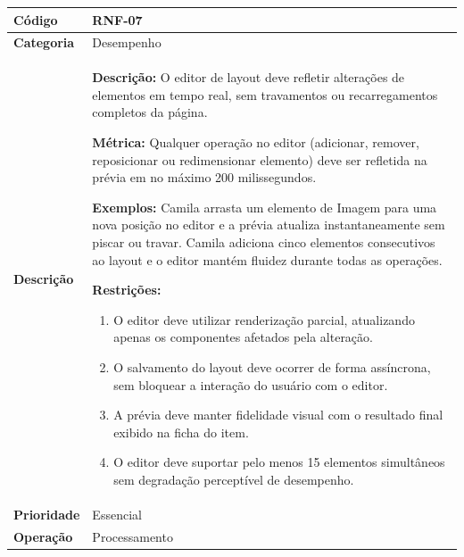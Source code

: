 \FloatBarrier
\begin{quadro}[h!]
\caption{RNF-07 -- Desempenho do Editor de Layout}
\label{quad:rnf07}
\begin{tabular}{|p{3.2cm}|p{11.8cm}|}
\hline
\textbf{Código}     & RNF-07 \\ \hline
\textbf{Categoria}  & Desempenho \\ \hline
\textbf{Descrição}  &
\textbf{Descrição:} O editor de layout deve refletir alterações de elementos em tempo real, sem travamentos ou recarregamentos completos da página.

\textbf{Métrica:} Qualquer operação no editor (adicionar, remover, reposicionar ou redimensionar elemento) deve ser refletida na prévia em no máximo 200 milissegundos.

\textbf{Exemplos:} Camila arrasta um elemento de Imagem para uma nova posição no editor e a prévia atualiza instantaneamente sem piscar ou travar.
Camila adiciona cinco elementos consecutivos ao layout e o editor mantém fluidez durante todas as operações.

\textbf{Restrições:}
\begin{enumerate}[nosep,leftmargin=1.2em,topsep=2pt,partopsep=0pt,parsep=0pt,itemsep=1pt]
  \item O editor deve utilizar renderização parcial, atualizando apenas os componentes afetados pela alteração.
  \item O salvamento do layout deve ocorrer de forma assíncrona, sem bloquear a interação do usuário com o editor.
  \item A prévia deve manter fidelidade visual com o resultado final exibido na ficha do item.
  \item O editor deve suportar pelo menos 15 elementos simultâneos sem degradação perceptível de desempenho.
\end{enumerate} \\ \hline
\textbf{Prioridade} & Essencial \\ \hline
\textbf{Operação}   & Processamento \\ \hline
\end{tabular}
\end{quadro}


